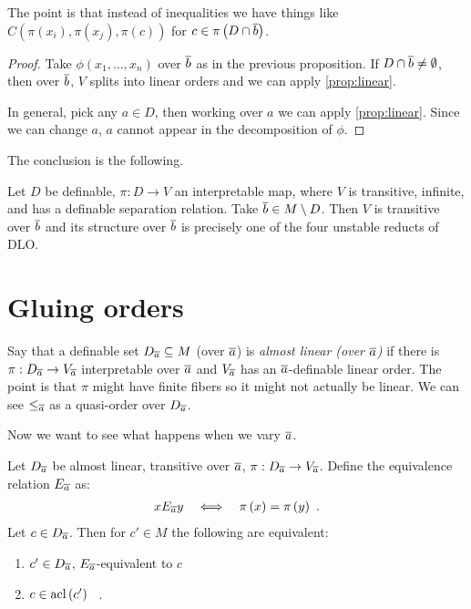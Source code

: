 \documentclass{amsart}
\begin{document}
The point is that instead of inequalities we have things like $C\left(\pi\left(x_i\right)
, \pi\left(x_j\right) , \pi\left(c\right)\right)$ for $c\in \pi\left(D\cap
\overline{b}\right)$. 

\begin{proof}
Take $\phi\left(x_1 , \ldots , x_n\right)$ over $\overline{b}$ as in the previous
proposition. If $D\cap \overline{b}\neq \emptyset$, then over $\overline{b}$, $V$ splits into linear
orders and we can apply \cref{prop:linear}.

In general, pick any $a\in D$, then working over $a$ we can apply \cref{prop:linear}. 
Since we can change $a$, $a$ cannot appear in the decomposition of $\phi$.
\end{proof}

The conclusion is the following. 
\begin{cor}
Let $D$ be definable, $\pi:D\to V$ an interpretable map, where $V$ is transitive,
infinite, and has a definable separation relation. Take $\overline{b}\in M\setminus D$. Then $V$
is transitive over $\overline{b}$ and its structure over $\overline{b}$ is precisely one of the
four unstable reducts of DLO.
\end{cor}

\section{Gluing orders}

Say that a definable set $D_{\overline{a}}\subseteq M$ (over $\overline{a}$) is \emph{almost
linear (over $\overline{a}$)} if there is $\pi: D_{\overline{a}}\rightarrow V_{\overline{a}}$
interpretable over $\overline{a}$ and $V_{\overline{a}}$ has an $\overline{a}$-definable linear
order. The point is that $\pi$ might have finite fibers so it might not actually be linear.
We can see $\leq_{\overline{a}}$ as a quasi-order over $D_{\overline{a}}$.

Now we want to see what happens when we vary $\overline{a}$. 

\begin{lem}
Let $D_{\overline{a}}$ be almost linear, transitive over $\overline{a}$, $\pi:
D_{\overline{a}}\rightarrow V_{\overline{a}}$. Define the equivalence relation $E_{\overline{a}}$ as:
\begin{align}
xE_{\overline{a}} y&& \iff &&\pi\left(x\right) = \pi\left(y\right) \ .
\end{align}
Let $c\in D_{\overline{a}}$. Then for $c'\in M$ the following are equivalent:
\begin{enumerate}
\item $c'\in D_{\overline{a}}$, $E_{\overline{a}}$-equivalent to $c$
\item $c\in \operatorname{acl}\left(c'\right)$ \ .
\end{enumerate}
\end{lem}
\end{document}
